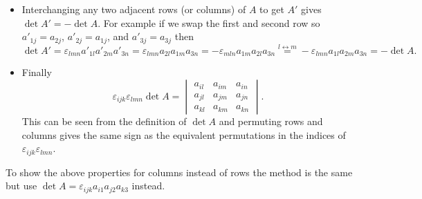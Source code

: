 \documentclass[a4paper]{article}
\newcommand{\swap}[2]{{#1} \leftrightarrow {#2}}
\newcommand{\swapEquals}[2]{\overset{\swap{#1}{#2}}{=}}
\begin{document}
\begin{itemize}
        \item Interchanging any two adjacent rows (or columns) of \(A\) to get \(A'\) gives \(\det A' = -\det A\).
        For example if we swap the first and second row so \(a'_{1j} = a_{2j}\), \(a'_{2j} = a_{1j}\), and \(a'_{3j} = a_{3j}\) then
        \[\det A' = \varepsilon_{lmn}a'_{1l}a'_{2m}a'_{3n} = \varepsilon_{lmn}a_{2l}a_{1m}a_{3n} = -\varepsilon_{mln}a_{1m}a_{2l}a_{3n} \swapEquals{l}{m} -\varepsilon_{lmn}a_{1l}a_{2m}a_{3n} = -\det A.\]
        \item Finally
        \begin{equation}\label{eqn:epsilon epsilon det A}
            \varepsilon_{ijk}\varepsilon_{lmn}\det A = 
            \begin{vmatrix}
                a_{il} & a_{im} & a_{in}\\
                a_{jl} & a_{jm} & a_{jn}\\
                a_{kl} & a_{km} & a_{kn}
            \end{vmatrix}
            .
        \end{equation}
        This can be seen from the definition of \(\det A\) and permuting rows and columns gives the same sign as the equivalent permutations in the indices of \(\varepsilon_{ijk}\varepsilon_{lmn}\).
    \end{itemize}
    To show the above properties for columns instead of rows the method is the same but use \(\det A = \varepsilon_{ijk}a_{i1}a_{j2}a_{k3}\) instead.
    
\end{document}
